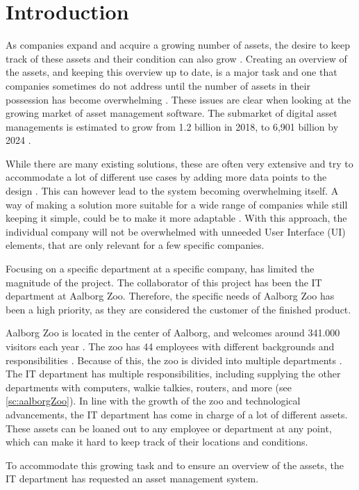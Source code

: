 \chapter{Introduction}\label{ch:introduction}
As companies expand and acquire a growing number of assets, the desire to keep track of these assets and their condition can also grow \citep{ImportanceOfAM}. Creating an overview of the assets, and keeping this overview up to date, is a major task and one that companies sometimes do not address until the number of assets in their possession has become overwhelming \citep{DoNotIgnoreSAM}. These issues are clear when looking at the growing market of asset management software. The submarket of digital asset managements is estimated to grow from 1.2 billion in 2018, to 6,901 billion by 2024 \citep{MarketGrowth}.
\par
While there are many existing solutions, these are often very extensive and try to accommodate a lot of different use cases by adding more data points to the design \citep{SnipeIT}. This can however lead to the system becoming overwhelming itself. A way of making a solution more suitable for a wide range of companies while still keeping it simple, could be to make it more adaptable \citep{CustomSoftware}. With this approach, the individual company will not be overwhelmed with unneeded User Interface (UI) elements, that are only relevant for a few specific companies.
\par
Focusing on a specific department at a specific company, has limited the magnitude of the project. The collaborator of this project has been the IT department at Aalborg Zoo. Therefore, the specific needs of Aalborg Zoo has been a high priority, as they are considered the customer of the finished product.
\par
Aalborg Zoo is located in the center of Aalborg, and welcomes around 341.000 visitors each year \citep{AalborgZoo}. The zoo has 44 employees with different backgrounds and responsibilities \citep{AalborgZoo}. Because of this, the zoo is divided into multiple departments \citep{PersonaleAZ}. The IT department has multiple responsibilities, including supplying the other departments with computers, walkie talkies, routers, and more (see \autoref{sc:aalborgZoo}). In line with the growth of the zoo and technological advancements, the IT department has come in charge of a lot of different assets. These assets can be loaned out to any employee or department at any point, which can make it hard to keep track of their locations and conditions.
\par
To accommodate this growing task and to ensure an overview of the assets, the IT department has requested an asset management system.

